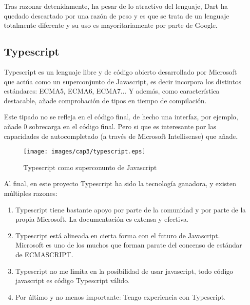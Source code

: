 \bigskip
Tras razonar detenidamente, ha pesar de lo atractivo del lenguaje, Dart ha quedado descartado por 
una razón de peso y es que se trata de un lenguaje totalmente diferente y su uso es mayoritariamente
por parte de Google.

\subsection{Typescript}

Typescript es un lenguaje libre y de código abierto desarrollado por Microsoft que actúa como un superconjunto
de Javascript, es decir incorpora los distintos estándares: ECMA5, ECMA6, ECMA7... Y además, como característica
destacable, añade comprobación de tipos en tiempo de compilación.

\bigskip
Este tipado no se refleja en el código final, de hecho una interfaz, por ejemplo,
añade 0 sobrecarga en el código final. Pero si que es interesante por las capacidades de
autocompletado (a través de Microsoft Intellisense)  que añade.

\begin{figure}[!th]
\begin{center}
\texttt{[image: images/cap3/typescript.eps]}
\caption{Typescript como superconunto de Javascript}
\label{fig:Typescript como superconunto de Javascript}
\end{center}
\end{figure}

\bigskip
Al final, en este proyecto Typescript ha sido la tecnología ganadora, y existen múltiples
razones:

\begin{enumerate}

\item Typescript tiene bastante apoyo por parte de la comunidad y por parte de la propia Microsoft.
La documentación es extensa y efectiva.

\item Typescript está alineada en cierta forma con el futuro de Javascript. Microsoft es uno de los 
muchos que forman parate del concenso de estándar de ECMASCRIPT.

\item Typescript no me limita en la posibilidad de usar javascript, todo código javascript es código
Typescript válido.

\item Por último y no menos importante: Tengo experiencia con Typescript.
\end{enumerate}

